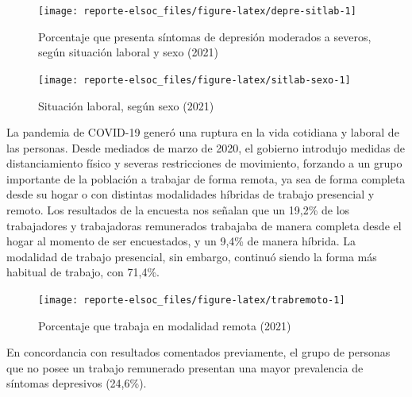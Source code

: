 \documentclass[
  12pt,
]{book}
\begin{document}
\begin{figure}

{\centering \texttt{[image: reporte-elsoc\_files/figure-latex/depre-sitlab-1]} 

}

\caption{Porcentaje que presenta síntomas de depresión moderados a severos, según situación laboral y sexo (2021)}\label{fig:depre-sitlab}
\end{figure}

\begin{figure}

{\centering \texttt{[image: reporte-elsoc\_files/figure-latex/sitlab-sexo-1]} 

}

\caption{Situación laboral, según sexo (2021)}\label{fig:sitlab-sexo}
\end{figure}

La pandemia de COVID-19 generó una ruptura en la vida cotidiana y laboral de las personas. Desde mediados de marzo de 2020, el gobierno introdujo medidas de distanciamiento físico y severas restricciones de movimiento, forzando a un grupo importante de la población a trabajar de forma remota, ya sea de forma completa desde su hogar o con distintas modalidades híbridas de trabajo presencial y remoto. Los resultados de la encuesta nos señalan que un 19,2\% de los trabajadores y trabajadoras remunerados trabajaba de manera completa desde el hogar al momento de ser encuestados, y un 9,4\% de manera híbrida. La modalidad de trabajo presencial, sin embargo, continuó siendo la forma más habitual de trabajo, con 71,4\%.

\begin{figure}

{\centering \texttt{[image: reporte-elsoc\_files/figure-latex/trabremoto-1]} 

}

\caption{Porcentaje que trabaja en modalidad remota (2021)}\label{fig:trabremoto}
\end{figure}

En concordancia con resultados comentados previamente, el grupo de personas que no posee un trabajo remunerado presentan una mayor prevalencia de síntomas depresivos (24,6\%).
\end{document}
